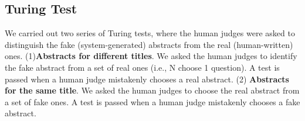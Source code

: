 \documentclass[11pt,a4paper]{article}
\begin{document}
 \subsection{Turing Test}
\label{Turing Tests}
We carried out two series of Turing tests, where the human judges were asked to distinguish the fake (system-generated) abstracts from the real (human-written) ones. (1)\textbf{Abstracts for different titles}. We asked the human judges to identify the fake abstract from a set of  real ones (i.e., N choose 1 question). A test is passed when a human judge mistakenly chooses a real abstract.
(2) \textbf{Abstracts for the same title}. We asked the human judges to choose the real abstract from a set of  fake ones. A test is passed when a human judge mistakenly chooses a fake abstract.
\end{document}
